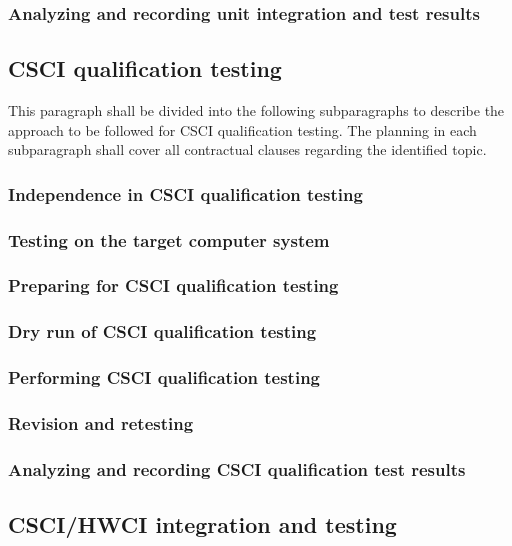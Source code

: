 \subsubsection{Analyzing and recording unit integration and test
results}

\subsection{CSCI qualification testing}

This paragraph shall be divided into the following subparagraphs to
describe the approach to be followed for CSCI qualification testing. The
planning in each subparagraph shall cover all contractual clauses
regarding the identified topic.

\subsubsection{Independence in CSCI qualification testing}

\subsubsection{Testing on the target computer system}

\subsubsection{Preparing for CSCI qualification testing}

\subsubsection{Dry run of CSCI qualification testing}

\subsubsection{Performing CSCI qualification testing}

\subsubsection{Revision and retesting}

\subsubsection{Analyzing and recording CSCI qualification test results}

\subsection{CSCI/HWCI integration and testing}

